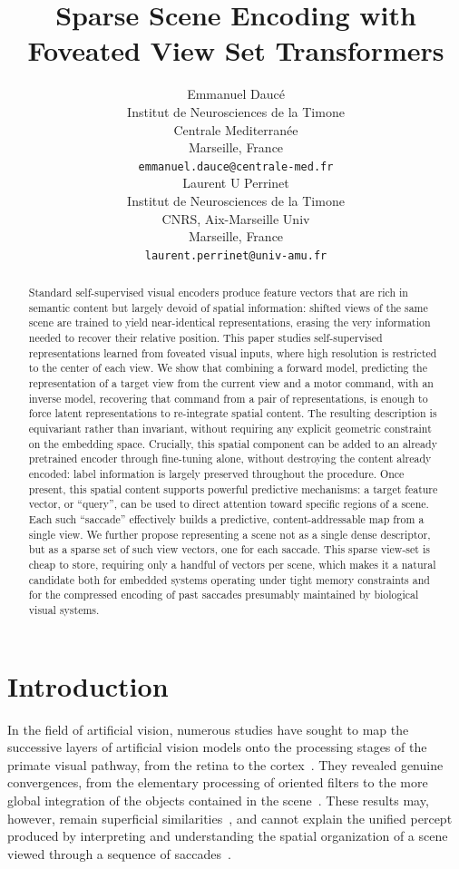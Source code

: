 \documentclass{article}
\title{Sparse Scene Encoding with Foveated View Set Transformers}
\author{%
  Emmanuel Daucé \\
  Institut de Neurosciences de la Timone\\
  Centrale Mediterranée\\
  Marseille, France \\
  \texttt{emmanuel.dauce@centrale-med.fr} \\
  \And
  Laurent U Perrinet \\
  Institut de Neurosciences de la Timone\\
  CNRS, Aix-Marseille Univ\\
  Marseille, France \\
  \texttt{laurent.perrinet@univ-amu.fr}
}
\begin{document}
\maketitle


\begin{abstract}
  Standard self-supervised visual encoders produce feature vectors that are rich in semantic content but largely devoid of spatial information: shifted views of the same scene are trained to yield near-identical representations, erasing the very information needed to recover their relative position. This paper studies self-supervised representations learned from foveated visual inputs, where high resolution is restricted to the center of each view. We show that combining a forward model, predicting the representation of a target view from the current view and a motor command, with an inverse model, recovering that command from a pair of representations, is enough to force latent representations to re-integrate spatial content. The resulting description is equivariant rather than invariant, without requiring any explicit geometric constraint on the embedding space. Crucially, this spatial component can be added to an already pretrained encoder through fine-tuning alone, without destroying the content already encoded: label information is largely preserved throughout the procedure. Once present, this spatial content supports powerful predictive mechanisms: a target feature vector, or ``query'', can be used to direct attention toward specific regions of a scene. Each such ``saccade'' effectively builds a predictive, content-addressable map from a single view. We further propose representing a scene not as a single dense descriptor, but as a sparse set of such view vectors, one for each saccade. This sparse view-set is cheap to store, requiring only a handful of vectors per scene, which makes it a natural candidate both for embedded systems operating under tight memory constraints and for the compressed encoding of past saccades presumably maintained by biological visual systems.
\end{abstract}

\section{Introduction}

In the field of artificial vision, numerous studies have sought to  map the successive layers of artificial vision models onto the processing stages of the primate visual pathway, from the retina to the cortex~\cite{hubel1962receptive,felleman1991distributed,fukushima1980neocognitron,yamins2014performance,yamins2016using}. They revealed genuine convergences, from the elementary processing of oriented filters to the more global integration of the objects contained in the scene~\cite{zeiler2014visualizing,guclu2015deep,cichy2016comparison,eickenberg2017seeing,khaligh2014deep,schrimpf2020integrative}. These results may, however, remain superficial similarities~\cite{geirhos2019imagenet,bowers2023deep}, and cannot explain the unified percept produced by interpreting and understanding the spatial organization of a scene viewed through a sequence of saccades~\cite{melcher2008transsaccadic}. 
\end{document}
